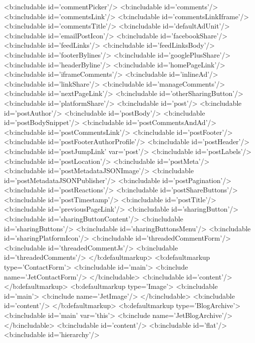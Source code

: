 {{{{    <b:includable id='commentPicker'/>
    <b:includable id='comments'/>
    <b:includable id='commentsLink'/>
    <b:includable id='commentsLinkIframe'/>
    <b:includable id='commentsTitle'/>
    <b:includable id='defaultAdUnit'/>
    <b:includable id='emailPostIcon'/>
    <b:includable id='facebookShare'/>
    <b:includable id='feedLinks'/>
    <b:includable id='feedLinksBody'/>
    <b:includable id='footerBylines'/>
    <b:includable id='googlePlusShare'/>
    <b:includable id='headerByline'/>
    <b:includable id='homePageLink'/>
    <b:includable id='iframeComments'/>
    <b:includable id='inlineAd'/>
    <b:includable id='linkShare'/>
    <b:includable id='manageComments'/>
    <b:includable id='nextPageLink'/>
    <b:includable id='otherSharingButton'/>
    <b:includable id='platformShare'/>
    <b:includable id='post'/>
    <b:includable id='postAuthor'/>
    <b:includable id='postBody'/>
    <b:includable id='postBodySnippet'/>
    <b:includable id='postCommentsAndAd'/>
    <b:includable id='postCommentsLink'/>
    <b:includable id='postFooter'/>
    <b:includable id='postFooterAuthorProfile'/>
    <b:includable id='postHeader'/>
    <b:includable id='postJumpLink' var='post'/>
    <b:includable id='postLabels'/>
    <b:includable id='postLocation'/>
    <b:includable id='postMeta'/>
    <b:includable id='postMetadataJSONImage'/>
    <b:includable id='postMetadataJSONPublisher'/>
    <b:includable id='postPagination'/>
    <b:includable id='postReactions'/>
    <b:includable id='postShareButtons'/>
    <b:includable id='postTimestamp'/>
    <b:includable id='postTitle'/>
    <b:includable id='previousPageLink'/>
    <b:includable id='sharingButton'/>
    <b:includable id='sharingButtonContent'/>
    <b:includable id='sharingButtons'/>
    <b:includable id='sharingButtonsMenu'/>
    <b:includable id='sharingPlatformIcon'/>
    <b:includable id='threadedCommentForm'/>
    <b:includable id='threadedCommentJs'/>
    <b:includable id='threadedComments'/>
  </b:defaultmarkup>
  <b:defaultmarkup type='ContactForm'>
    <b:includable id='main'>
      <b:include name='JetContactForm'/>
    </b:includable>    
    <b:includable id='content'/>
  </b:defaultmarkup>
  <b:defaultmarkup type='Image'>
    <b:includable id='main'>
      <b:include name='JetImage'/>
    </b:includable>
    <b:includable id='content'/>
  </b:defaultmarkup>
  <b:defaultmarkup type='BlogArchive'>
    <b:includable id='main' var='this'>
      <b:include name='JetBlogArchive'/>
    </b:includable>
    <b:includable id='content'/>
    <b:includable id='flat'/>
    <b:includable id='hierarchy'/>
}}}}
